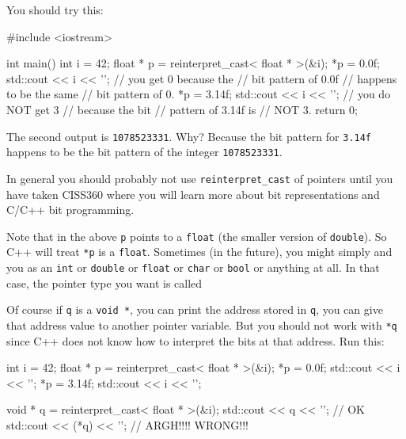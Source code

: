\begin{consolethree}[escapeinside=||]
You should try this:

\begin{console}
#include <iostream>

int main()
{   
    int i = 42;
    float * p = reinterpret_cast< float * >(&i);
    *p = 0.0f;
    std::cout << i << '\n'; // you get 0 because the
                            // bit pattern of 0.0f
                            // happens to be the same
                            // bit pattern of 0.
    *p = 3.14f;
    std::cout << i << '\n'; // you do NOT get 3
                            // because the bit
                            // pattern of 3.14f is
                            // NOT 3.
    return 0;
}
\end{console}

The second output is \texttt{1078523331}. Why? Because the bit pattern for \texttt{3.14f} happens to be the bit pattern of the integer \texttt{1078523331}.

In general you should probably not use \texttt{reinterpret\_cast} of pointers until you have taken CISS360 where you will learn more about bit representations and C/C++ bit programming.

Note that in the above \texttt{p} points to a \texttt{float} (the smaller version of \texttt{double}). So C++ will treat \texttt{*p} is a \texttt{float}. Sometimes (in the future), you might simply  and you  as an \texttt{int} or \texttt{double} or \texttt{float} or \texttt{char} or \texttt{bool} or anything at all. In that case, the pointer type you want is called

\begin{center}
\end{center}

Of course if \texttt{q} is a \texttt{void *}, you can print the address
stored in \texttt{q}, you can give that address value to another pointer
variable. But you should not work with \texttt{*q} since C++ does not know
how to interpret the bits at that address. Run this:

\begin{console}
int i = 42;
float * p = reinterpret_cast< float * >(&i);
*p = 0.0f;
std::cout << i << '\n';
*p = 3.14f;
std::cout << i << '\n';

void * q = reinterpret_cast< float * >(&i);
std::cout << q << '\n';    // OK
std::cout << (*q) << '\n'; // ARGH!!!! WRONG!!!
\end{console}


\end{consolethree}
